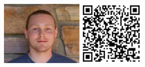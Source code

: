 \documentclass[landscape,final]{baposter}
\newcommand{\headshotsize}{1.25in}
\begin{document}
\begin{poster}
{{\begin{minipage}{5in}
\hspace{.5cm}
\includegraphics[height=\headshotsize]{headshot_sage}
\hspace{.5cm}
\includegraphics[height=\headshotsize]{QR}
\end{minipage}}}


     \newlength{\leftimgwidth}
     \setlength{\leftimgwidth}{0.78em+8.0em}

    \newcommand{\colouredcircle}[1]{%
      \tikz{\useasboundingbox (-0.2em,-0.32em) rectangle(0.2em,0.32em); \draw[draw=black,fill=baposterBGone!80!black!#1!white,line width=0.03em] (0,0) circle(0.18em);}}


\end{poster}
\end{document}

